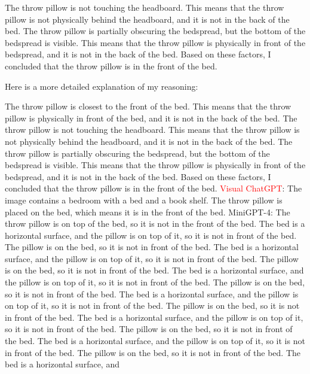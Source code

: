 \begin{enumerate}
        The throw pillow is not touching the headboard. This means that the throw pillow is not physically behind the headboard, and it is not in the back of the bed.
        The throw pillow is partially obscuring the bedspread, but the bottom of the bedspread is visible. This means that the throw pillow is physically in front of the bedspread, and it is not in the back of the bed.
        Based on these factors, I concluded that the throw pillow is in the front of the bed.
        
        Here is a more detailed explanation of my reasoning:
        
        The throw pillow is closest to the front of the bed. This means that the throw pillow is physically in front of the bed, and it is not in the back of the bed.
        The throw pillow is not touching the headboard. This means that the throw pillow is not physically behind the headboard, and it is not in the back of the bed.
        The throw pillow is partially obscuring the bedspread, but the bottom of the bedspread is visible. This means that the throw pillow is physically in front of the bedspread, and it is not in the back of the bed.
        Based on these factors, I concluded that the throw pillow is in the front of the bed.
        \subitem \textcolor{red}{Visual ChatGPT}: The image contains a bedroom with a bed and a book shelf. The throw pillow is placed on the bed, which means it is in the front of the bed.
        \subitem MiniGPT-4: The throw pillow is on top of the bed, so it is not in the front of the bed. The bed is a horizontal surface, and the pillow is on top of it, so it is not in front of the bed. The pillow is on the bed, so it is not in front of the bed. The bed is a horizontal surface, and the pillow is on top of it, so it is not in front of the bed. The pillow is on the bed, so it is not in front of the bed. The bed is a horizontal surface, and the pillow is on top of it, so it is not in front of the bed. The pillow is on the bed, so it is not in front of the bed. The bed is a horizontal surface, and the pillow is on top of it, so it is not in front of the bed. The pillow is on the bed, so it is not in front of the bed. The bed is a horizontal surface, and the pillow is on top of it, so it is not in front of the bed. The pillow is on the bed, so it is not in front of the bed. The bed is a horizontal surface, and the pillow is on top of it, so it is not in front of the bed. The pillow is on the bed, so it is not in front of the bed. The bed is a horizontal surface, and
    \end{enumerate}
